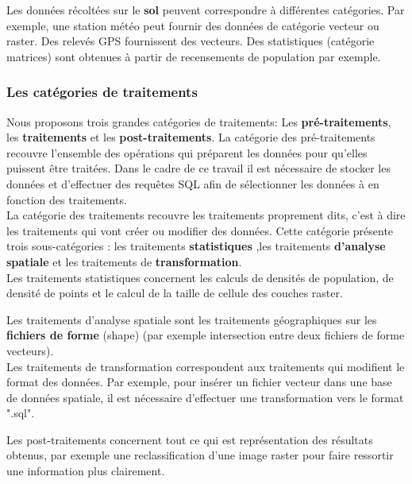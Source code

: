 Les données récoltées sur le \textbf{sol} peuvent correspondre à différentes catégories. Par exemple, une station météo peut fournir des données de catégorie vecteur ou raster. Des relevés GPS fournissent des vecteurs. Des statistiques (catégorie matrices) sont obtenues à partir de recensements de population par exemple.


\subsubsection{Les catégories de traitements}



Nous proposons trois grandes catégories de traitements: Les \textbf{pré-traitements}, les \textbf{traitements} et les \textbf{post-traitements}.
La catégorie des pré-traitements recouvre l'ensemble des opérations qui préparent les données pour qu'elles puissent être traitées. Dans le cadre de ce travail il est nécessaire de stocker les données et d'effectuer des requêtes SQL afin de sélectionner les données à en fonction des traitements.\\

La catégorie des traitements recouvre les traitements proprement dits, c'est à dire les traitements qui vont créer ou modifier des données. Cette catégorie présente trois sous-catégories : les traitements \textbf{statistiques} ,les traitements \textbf{d'analyse spatiale} et les traitements de \textbf{transformation}. \\

Les traitements statistiques concernent les calculs de densités de population, de densité de points et le calcul de la taille de cellule des couches raster.

Les traitements d'analyse spatiale sont les traitements géographiques sur les \textbf{fichiers de forme} (shape) (par exemple intersection entre deux fichiers de forme vecteurs).\\

Les traitements de transformation correspondent aux traitements qui modifient le format des données. Par exemple, pour insérer un fichier vecteur dans une base de données spatiale, il est nécessaire d'effectuer une transformation vers le format ".sql".

Les post-traitements concernent tout ce qui est représentation des résultats obtenus, par exemple une reclassification d'une image raster pour faire ressortir une information plus clairement.



